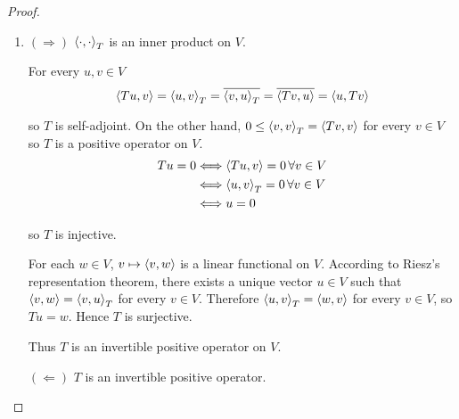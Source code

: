 \begin{proof}
    \begin{enumerate}[label={(\alph*)}]
        \item $(\Rightarrow)$ $\left\langle{\cdot,\cdot}\right\rangle_{T}$ is an inner product on $V$.

              For every $u, v\in V$
              \[
                  \left\langle{Tu, v}\right\rangle = \left\langle{u, v}\right\rangle_{T} = \overline{\left\langle{v, u}\right\rangle_{T}} = \overline{\left\langle{Tv, u}\right\rangle} = \left\langle{u, Tv}\right\rangle
              \]

              so $T$ is self-adjoint. On the other hand, $0\leq \left\langle{v, v}\right\rangle_{T} = \left\langle{Tv, v}\right\rangle$ for every $v\in V$ so $T$ is a positive operator on $V$.
              \begin{align*}
                  Tu = 0 & \Longleftrightarrow \left\langle{Tu, v}\right\rangle = 0\,\forall v\in V    \\
                         & \Longleftrightarrow \left\langle{u, v}\right\rangle_{T} = 0\,\forall v\in V \\
                         & \Longleftrightarrow u = 0
              \end{align*}

              so $T$ is injective.

              For each $w\in V$, $v\mapsto \left\langle{v, w}\right\rangle$ is a linear functional on $V$. According to Riesz's representation theorem, there exists a unique vector $u\in V$ such that $\left\langle{v, w}\right\rangle = \left\langle{v, u}\right\rangle_{T}$ for every $v\in V$. Therefore $\left\langle{u, v}\right\rangle_{T} = \left\langle{w, v}\right\rangle$ for every $v\in V$, so $Tu = w$. Hence $T$ is surjective.

              Thus $T$ is an invertible positive operator on $V$.
              \bigskip

              $(\Leftarrow)$ $T$ is an invertible positive operator.


\end{enumerate}
\end{proof}
